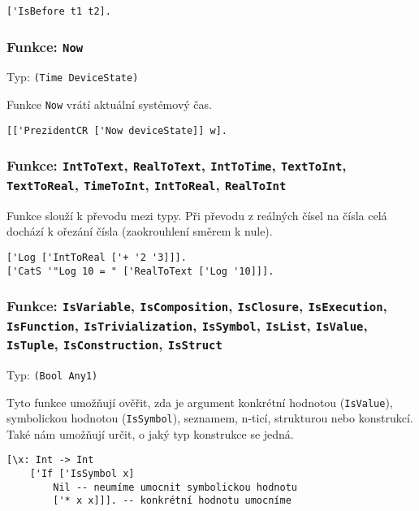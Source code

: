 \begin{lstlisting}[caption={Ukázka porovnávání časových okamžiků}]
['IsBefore t1 t2].
\end{lstlisting}

\subsubsection*{Funkce: \lstinline{Now}}
Typ: \lstinline{(Time DeviceState)}

Funkce \lstinline{Now} vrátí aktuální systémový čas.

\begin{lstlisting}[caption={Ukázka využití Now}]
[['PrezidentCR ['Now deviceState]] w].
\end{lstlisting}

\subsubsection*{Funkce: \lstinline{IntToText},
\lstinline{RealToText},
\lstinline{IntToTime},
\lstinline{TextToInt},
\lstinline{TextToReal},
\lstinline{TimeToInt},
\lstinline{IntToReal},
\lstinline{RealToInt}
}

Funkce slouží k převodu mezi typy. Při převodu z reálných čísel na čísla celá dochází k ořezání
čísla (zaokrouhlení směrem k nule).

\begin{lstlisting}[caption={Ukázka využití konverzí}]
['Log ['IntToReal ['+ '2 '3]]].
['CatS '"Log 10 = " ['RealToText ['Log '10]]].
\end{lstlisting}

\subsubsection*{Funkce:
\lstinline{IsVariable},
\lstinline{IsComposition},
\lstinline{IsClosure},
\lstinline{IsExecution},
\lstinline{IsFunction},
\lstinline{IsTrivialization},
\lstinline{IsSymbol},
\lstinline{IsList},
\lstinline{IsValue},
\lstinline{IsTuple},
\lstinline{IsConstruction},
\lstinline{IsStruct}
}

Typ: \lstinline{(Bool Any1)}

Tyto funkce umožňují ověřit, zda je argument konkrétní hodnotou (\lstinline{IsValue}), symbolickou
hodnotou (\lstinline{IsSymbol}), seznamem, n-ticí, strukturou nebo konstrukcí. Také nám umožňují
určit, o jaký typ konstrukce se jedná.

\begin{lstlisting}[caption={Ukázka využití IsSymbol}]
[\x: Int -> Int
    ['If ['IsSymbol x]
        Nil -- neumíme umocnit symbolickou hodnotu
        ['* x x]]]. -- konkrétní hodnotu umocníme
\end{lstlisting}

